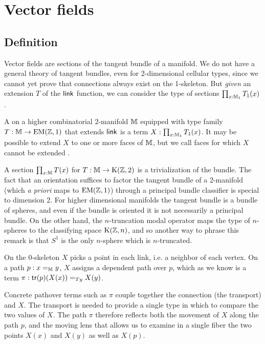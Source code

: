 \section{Vector fields}
\label{sec:vector_fields}
\subsection{Definition}
Vector fields are sections of the tangent bundle of a manifold. We do not have a general theory of tangent bundles, even for 2-dimensional cellular types, since we cannot yet prove that connections always exist on the 1-skeleton. But \emph{given} an extension \( T \) of the \( \operatorname{\mathsf{link}} \) function, we can consider the type of sections \( \prod_{x:\mathbb{M}_1}T_1(x) \).

\begin{mydef}
A  on a higher combinatorial 2-manifold \( \mathbb{M} \) equipped with type family \( T:\mathbb{M}\to\mathrm{EM}(\mathbb{Z},1) \) that extends \( \operatorname{\mathsf{link}} \) is a term \( X:\prod_{x:\mathbb{M}_1}T_1(x) \). It may be possible to extend \( X \) to one or more faces of \( \mathbb{M} \), but we call faces for which \( X \) cannot be extended .
\end{mydef}

\begin{mynote}
A section \( \prod_{x:\mathbb{M}}T(x) \) for \( T:\mathbb{M}\to\mathrm{K}(\mathbb{Z},2) \) is a trivialization of the bundle. The fact that an orientation suffices to factor the tangent bundle of a 2-manifold (which \emph{a priori} maps to \( \mathrm{EM}(\mathbb{Z},1) \)) through a principal bundle classifier is special to dimension 2. For higher dimensional manifolds the tangent bundle is a bundle of spheres, and even if the bundle is oriented it is not necessarily a principal bundle. On the other hand, the \( n \)-truncation modal operator maps the type of \( n \)-spheres to the classifying space \( \mathrm{K}(\mathbb{Z},n) \), and so another way to phrase this remark is that \( S^1 \) is the only \( n \)-sphere which is \( n \)-truncated.
\end{mynote}

On the 0-skeleton \( X \) picks a point in each link, i.e. a neighbor of each vertex. On a path \( p:x=_{\mathbb{M}} y \), \( X \) assigns a dependent path over \( p \), which as we know is a term \( \pi:\mathsf{tr}(p)(X(x))=_{T y} X(y) \).

\begin{mynote}Concrete pathover terms such as \( \pi \) couple together the connection (the transport) and \( X \). The transport is needed to provide a single type in which to compare the two values of \( X \). The path \( \pi \) therefore reflects both the movement of \( X \) along the path \( p \), and the moving lens that allows us to examine in a single fiber the two points \( X(x) \) and \( X(y) \) as well as \( X(p) \).\end{mynote}

